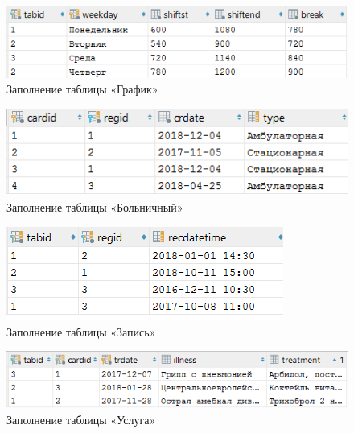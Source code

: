 \documentclass[14pt,a4paper,russian]{extreport}
\begin{document}
\vspace{0.00mm}

\begin{figure}[h]
        \center\includegraphics[scale=1]{itimetable}
        \caption{Заполнение таблицы «График»}
        \label{fig:itimetable}
\end{figure}

\vspace{0.00mm}

\begin{figure}[h]
        \center\includegraphics[scale=1]{medcard}
        \caption{Заполнение таблицы «Больничный»}
        \label{fig:sickleave}
\end{figure}

\vspace{0.00mm}

\begin{figure}[h]
        \center\includegraphics[scale=1]{appointment}
        \caption{Заполнение таблицы «Запись»}
        \label{fig:appointment}
\end{figure}

\vspace{0.00mm}

\cleardoublepage
\begin{figure}[!h]
        \center\includegraphics[scale=1]{treatment}
        \caption{Заполнение таблицы «Услуга»}
        \label{fig:service}
\end{figure}
\end{document}
